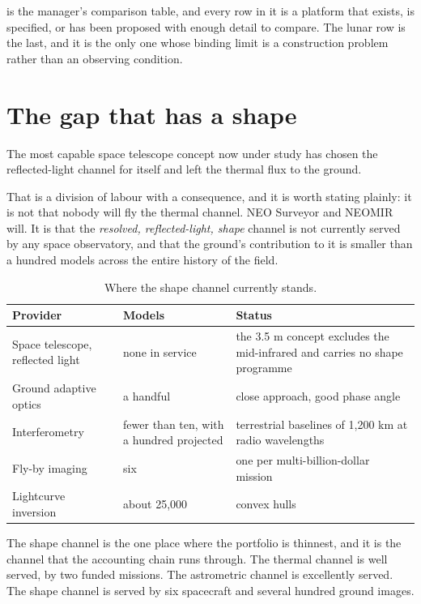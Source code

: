  is the manager's comparison table, and every row in
it is a platform that exists, is specified, or has been proposed with
enough detail to compare. The lunar row is the last, and it is the only one
whose binding limit is a construction problem rather than an observing
condition.

\section{The gap that has a shape}

The most capable space telescope concept now under study has chosen the
reflected-light channel for itself and left the thermal flux to the ground.

That is a division of labour with a consequence, and it is worth stating
plainly: it is not that nobody will fly the thermal channel. NEO Surveyor
and NEOMIR will. It is that the \emph{resolved, reflected-light, shape}
channel is not currently served by any space observatory, and that the
ground's contribution to it is smaller than a hundred models across the
entire history of the field.

\begin{table}[!htbp]
\centering
\small
\caption{Where the shape channel currently stands.}
\label{tab:shape-channel}
\begin{tabularx}{\textwidth}{@{}P{1.57in}P{0.99in}Y@{}}
\toprule
{}
\textbf{Provider} & \textbf{Models} & \textbf{Status} \\
\midrule
Space telescope, reflected light & none in service & the 3.5 m concept
excludes the mid-infrared and carries no shape programme \\
Ground adaptive optics & a handful & close approach, good phase angle \\
Interferometry & fewer than ten, with a hundred projected & terrestrial
baselines of 1,200 km at radio wavelengths \\
Fly-by imaging & six & one per multi-billion-dollar mission \\
Lightcurve inversion & about 25,000 & convex hulls \\
\bottomrule
\end{tabularx}
\end{table}

The shape channel is the one place where the portfolio is thinnest, and it
is the channel that the accounting chain runs through. The thermal channel
is well served, by two funded missions. The astrometric channel is
excellently served. The shape channel is served by six spacecraft and
several hundred ground images.

